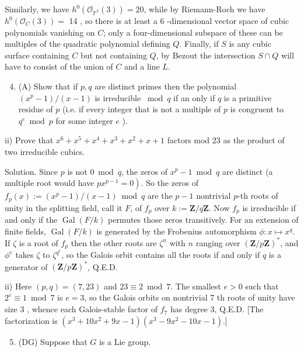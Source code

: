 \documentclass[10pt]{article}
\begin{document}
Similarly, we have $h^{0}\left(\mathcal{O}_{\mathbb{P}^{3}}(3)\right)=20$, while by Riemann-Roch we have $h^{0}\left(\mathcal{O}_{C}(3)\right)=$ 14 , so there is at least a 6 -dimensional vector space of cubic polynomials vanishing on $C$; only a four-dimensional subspace of these can be multiples of the quadratic polynomial defining $Q$. Finally, if $S$ is any cubic surface containing $C$ but not containing $Q$, by Bezout the intersection $S \cap Q$ will have to consist of the union of $C$ and a line $L$.

\begin{enumerate}
  \setcounter{enumi}{3}
  \item (A) Show that if $p, q$ are distinct primes then the polynomial $\left(x^{p}-1\right) /(x-1)$ is irreducible $\bmod q$ if an only if $q$ is a primitive residue of $p$ (i.e. if every integer that is not a multiple of $p$ is congruent to $q^{e} \bmod p$ for some integer $e$ ).
\end{enumerate}

ii) Prove that $x^{6}+x^{5}+x^{4}+x^{3}+x^{2}+x+1$ factors mod 23 as the product of two irreducible cubics.

Solution. Since $p$ is not $0 \bmod q$, the zeros of $x^{p}-1 \bmod q$ are distinct (a multiple root would have $\left.p x^{p-1}=0\right)$. So the zeros of $f_{p}(x):=\left(x^{p}-1\right) /(x-1) \bmod q$ are the $p-1$ nontrivial $p$-th roots of unity in the splitting field, call it $F$, of $f_{p}$ over $k:=\mathbf{Z} / q \mathbf{Z}$. Now $f_{p}$ is irreducible if and only if the $\operatorname{Gal}(F / k)$ permutes those zeros transitively. For an extension of finite fields, $\operatorname{Gal}(F / k)$ is generated by the Frobenius automorphism $\phi: x \mapsto x^{q}$. If $\zeta$ is a root of $f_{p}$ then the
other roots are $\zeta^{n}$ with $n$ ranging over $(\mathbf{Z} / p \mathbf{Z})^{*}$, and $\phi^{e}$ takes $\zeta$ to $\zeta^{q^{e}}$, so the Galois orbit contains all the roots if and only if $q$ is a generator of $(\mathbf{Z} / p \mathbf{Z})^{*}$, Q.E.D.

ii) Here $(p, q)=(7,23)$ and $23 \equiv 2 \bmod 7$. The smallest $e>0$ such that $2^{e} \equiv 1 \bmod 7$ is $e=3$, so the Galois orbits on nontrivial 7 th roots of unity have size 3 , whence each Galois-stable factor of $f_{7}$ has degree 3, Q.E.D. [The factorization is $\left(x^{3}+10 x^{2}+9 x-1\right)\left(x^{3}-9 x^{2}-10 x-1\right)$.]

\begin{enumerate}
  \setcounter{enumi}{4}
  \item (DG) Suppose that $G$ is a Lie group.
\end{enumerate}
\end{document}
